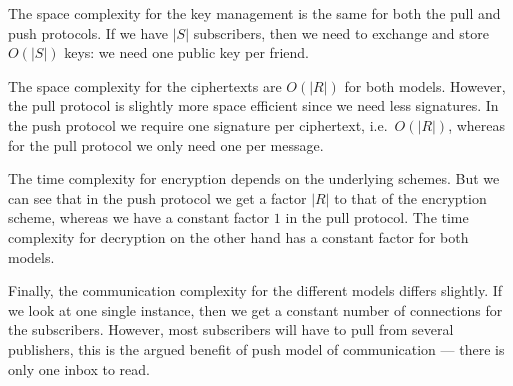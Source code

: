 The space complexity for the key management is the same for both the pull and 
push protocols.
If we have \(|S|\) subscribers, then we need to exchange and store \(O(|S|)\) 
keys:
we need one public key per friend.

The space complexity for the ciphertexts are \(O(|R|)\) for both models.
However, the pull protocol is slightly more space efficient since we need less 
signatures.
In the push protocol we require one signature per ciphertext, i.e.\ \(O(|R|)\), 
whereas for the pull protocol we only need one per message.

The time complexity for encryption depends on the underlying schemes.
But we can see that in the push protocol we get a factor \(|R|\) to that of the 
encryption scheme, whereas we have a constant factor \(1\) in the pull 
protocol.
The time complexity for decryption on the other hand has a constant factor for 
both models.

Finally, the communication complexity for the different models differs 
slightly.
If we look at one single instance, then we get a constant number of connections
for the subscribers.
However, most subscribers will have to pull from several publishers, this is 
the argued benefit of push model of communication --- there is only one inbox 
to read.

%


